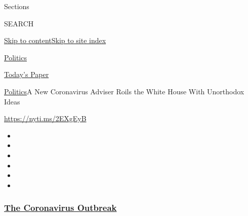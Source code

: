 Sections

SEARCH

\protect\hyperlink{site-content}{Skip to
content}\protect\hyperlink{site-index}{Skip to site index}

\href{https://www.nytimes3xbfgragh.onion/section/politics}{Politics}

\href{https://myaccount.nytimes3xbfgragh.onion/auth/login?response_type=cookie\&client_id=vi}{}

\href{https://www.nytimes3xbfgragh.onion/section/todayspaper}{Today's
Paper}

\href{/section/politics}{Politics}\textbar{}A New Coronavirus Adviser
Roils the White House With Unorthodox Ideas

\url{https://nyti.ms/2EXgEyB}

\begin{itemize}
\item
\item
\item
\item
\item
\item
\end{itemize}

\hypertarget{the-coronavirus-outbreak}{%
\subsubsection{\texorpdfstring{\href{https://www.nytimes3xbfgragh.onion/news-event/coronavirus?name=styln-coronavirus-national\&region=TOP_BANNER\&block=storyline_menu_recirc\&action=click\&pgtype=Article\&impression_id=71bab1e0-f4b5-11ea-b05b-4ba005ac198e\&variant=undefined}{The
Coronavirus
Outbreak}}{The Coronavirus Outbreak}}\label{the-coronavirus-outbreak}}

